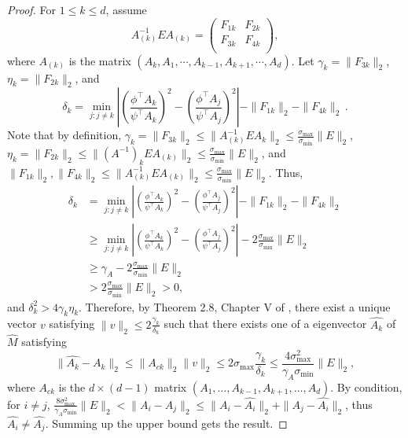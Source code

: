 \begin{proof}
For $1\le k\le d$, assume 
\[
A_{(k)}^{-1} E A_{(k)} =  
\left(
\begin{array}{cc}
F_{1k} & F_{2k}\\
F_{3k} & F_{4k} \\
\end{array} 
\right), 
\]
where $A_{(k)}$ is the matrix $(A_k, A_1, \cdots, A_{k-1}, A_{k+1}, \cdots, A_d)$.
Let $\gamma_k = \|F_{3k}\|_2$, $\eta_k = \|F_{2k}\|_2$, and 
\[
\delta_k = \min_{j: j\neq k} 
\left\vert \left(\frac{\phi^{\top}A_k}{\psi^{\top}A_k}\right)^2 -\left( \frac{\phi^{\top}A_j}{\psi^{\top}A_j}\right)^2 \right\vert - \|F_{1k}\|_2 - \|F_{4k}\|_2\,.
\]
Note that by definition, $\gamma_k = \|F_{3k}\|_2\le\|A_{(k)}^{-1}EA_{k}\|_2\le\frac{\sigma_{\max}}{\sigma_{\min}}\|E\|_2$,
 $\eta_k = \|F_{2k}\|_2\le\|(A^{-1})_kEA_{(k)}\|_2\le\frac{\sigma_{\max}}{\sigma_{\min}}\|E\|_2$, 
 and $\|F_{1k}\|_2,\|F_{4k}\|_2\le\|A_{(k)}^{-1} E A_{(k)}\|_2\le\frac{\sigma_{\max}}{\sigma_{\min}}\|E\|_2$. 
 Thus,
\begin{align*}
\delta_k & = \min_{j:j\neq k} 
	\left\vert \left(\frac{\phi^{\top}A_k}{\psi^{\top}A_k}\right)^2 - \left(\frac{\phi^{\top}A_j}{\psi^{\top}A_j}\right)^2 \right\vert - \|F_{1k}\|_2 - \|F_{4k}\|_2\\
	& \ge \min_{j:j\neq k} \left\vert \left(\frac{\phi^{\top}A_k}{\psi^{\top}A_k}\right)^2 - \left(\frac{\phi^{\top}A_j}{\psi^{\top}A_j}\right)^2 \right\vert - 2 \frac{\sigma_{\max}}{\sigma_{\min}}\|E\|_2\\
	& \ge  \gamma_A -  2 \frac{\sigma_{\max}}{\sigma_{\min}}\|E\|_2 \\
	& >  2 \frac{\sigma_{\max}}{\sigma_{\min}}\|E\|_2 >0,
\end{align*}
and $\delta_k^2 > 4\gamma_k\eta_k$. 
Therefore, by Theorem 2.8, Chapter V of \citep{stewart1990matrix}, there exist a unique vector $v$ satisfying $\|v\|_2\le 2\frac{\gamma_k}{\delta_k}$ such that there exists one of a eigenvector $\hat{A_k}$ of $\hat{M}$ satisfying
 \[
 \|\hat{A_k} - A_k\|_2 \le \|A_{ck}\|_2 \|v\|_2 \le 2\sigma_{\max}\frac{\gamma_k}{\delta_k}
 \le 
 \frac{4\sigma_{\max}^2}{\gamma_A \sigma_{\min}} \|E\|_2,
 \]
 where $A_{ck}$ is the $d\times (d-1)$ matrix $(A_1,\ldots,A_{k-1}, A_{k+1},\ldots,A_d)$.
 By condition, for $i\neq j$,  $\frac{8\sigma_{\max}^2}{\gamma_A \sigma_{\min}} \|E\|_2 < \|A_i - A_j\|_2\le \|A_i - \hat{A_i}\|_2 + \|A_j - \hat{A_i}\|_2$, thus $\hat{A_i} \neq \hat{A_j}$.  Summing up the upper bound gets the result. 
\end{proof}
